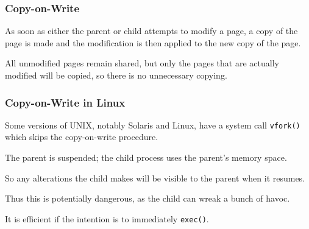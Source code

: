 \begin{frame}
\frametitle{Copy-on-Write}

As soon as either the parent or child attempts to modify a page, a copy of the page is made and the modification is then applied to the new copy of the page. 

All unmodified pages remain shared, but only the pages that are actually modified will be copied, so there is no unnecessary copying.

\end{frame}



\begin{frame}
\frametitle{Copy-on-Write in Linux}

Some versions of UNIX, notably Solaris and Linux, have a system call \texttt{vfork()} which skips the copy-on-write procedure. 

The parent is suspended; the child process uses the parent's memory space. 

So any alterations the child makes will be visible to the parent when it resumes. 

Thus this is potentially dangerous, as the child can wreak a bunch of havoc.

It is efficient if the intention is to immediately \texttt{exec()}.


\end{frame}



